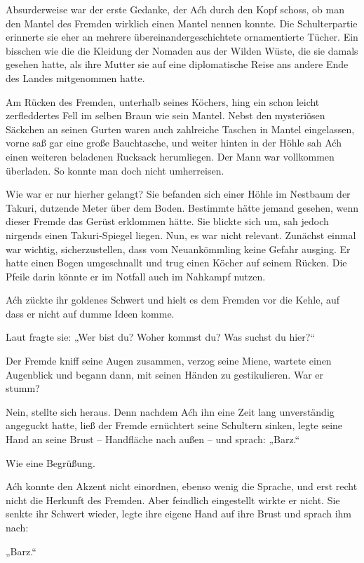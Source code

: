 Absurderweise war der erste Gedanke, der Aćh durch den Kopf schoss, ob man den Mantel des Fremden wirklich einen Mantel nennen konnte. Die Schulterpartie erinnerte sie eher an mehrere übereinandergeschichtete ornamentierte Tücher. Ein bisschen wie die die Kleidung der Nomaden aus der Wilden Wüste, die sie damals gesehen hatte, als ihre Mutter sie auf eine diplomatische Reise ans andere Ende des Landes mitgenommen hatte.

Am Rücken des Fremden, unterhalb seines Köchers, hing ein schon leicht zerfleddertes Fell im selben Braun wie sein Mantel. Nebst den mysteriösen Säckchen an seinen Gurten waren auch zahlreiche Taschen in Mantel eingelassen, vorne saß gar eine große Bauchtasche, und weiter hinten in der Höhle sah Aćh einen weiteren beladenen Rucksack herumliegen. Der Mann war vollkommen überladen. So konnte man doch nicht umherreisen.

Wie war er nur hierher gelangt? Sie befanden sich einer Höhle im Nestbaum der Takuri, dutzende Meter über dem Boden. Bestimmte hätte jemand gesehen, wenn dieser Fremde das Gerüst erklommen hätte. Sie blickte sich um, sah jedoch nirgends einen Takuri-Spiegel liegen. Nun, es war nicht relevant. Zunächst einmal war wichtig, sicherzustellen, dass vom Neuankömmling keine Gefahr ausging. Er hatte einen Bogen umgeschnallt und trug einen Köcher auf seinem Rücken. Die Pfeile darin könnte er im Notfall auch im Nahkampf nutzen.

Aćh zückte ihr goldenes Schwert und hielt es dem Fremden vor die Kehle, auf dass er nicht auf dumme Ideen komme.

Laut fragte sie: „Wer bist du? Woher kommst du? Was suchst du hier?“

Der Fremde kniff seine Augen zusammen, verzog seine Miene, wartete einen Augenblick und begann dann, mit seinen Händen zu gestikulieren. War er stumm?

Nein, stellte sich heraus. Denn nachdem Aćh ihn eine Zeit lang unverständig angeguckt hatte, ließ der Fremde ernüchtert seine Schultern sinken, legte seine Hand an seine Brust – Handfläche nach außen – und sprach: „Barz.“

Wie eine Begrüßung.

Aćh konnte den Akzent nicht einordnen, ebenso wenig die Sprache, und erst recht nicht die Herkunft des Fremden. Aber feindlich eingestellt wirkte er nicht. Sie senkte ihr Schwert wieder, legte ihre eigene Hand auf ihre Brust und sprach ihm nach:

„Barz.“

